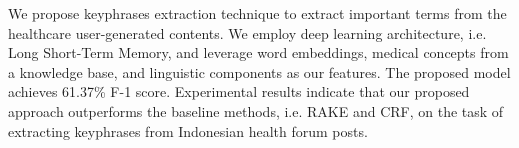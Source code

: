 We propose keyphrases extraction technique to extract important terms from the healthcare user-generated contents. We employ deep learning architecture, i.e. Long Short-Term Memory, and leverage word embeddings, medical concepts from a knowledge base, and linguistic components as our features. The proposed model achieves 61.37\% F-1 score. Experimental results indicate that our proposed approach outperforms the baseline methods, i.e. RAKE and CRF, on the task of extracting keyphrases from Indonesian health forum posts.
